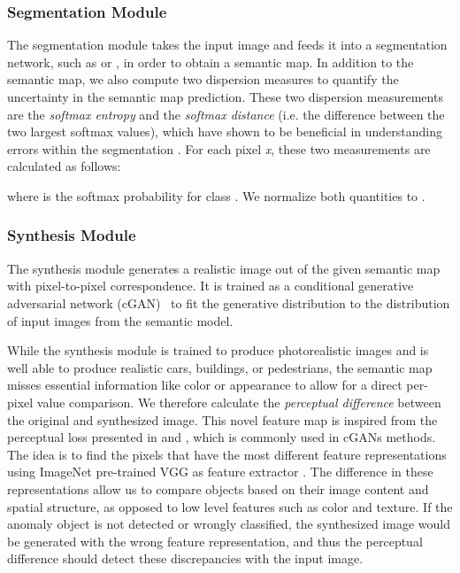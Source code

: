 \documentclass[final]{cvpr}
\begin{document}
\subsubsection{Segmentation Module}
The segmentation module takes the input image and feeds it into a segmentation network, such as \cite{DeepLabV3+Label} or \cite{PSPNet}, in order to obtain a semantic map. In addition to the semantic map, we also compute two dispersion measures to quantify the uncertainty in the semantic map prediction. These two dispersion measurements are the \textit{softmax entropy}  \cite{entropy, bayes_ensemble} and the \textit{softmax distance}  (i.e. the difference between the two largest softmax values), which have shown to be beneficial in understanding errors within the segmentation \cite{meta}. For each pixel \textit{x}, these two measurements are calculated as follows:





where  is the softmax probability  for class . We normalize both quantities to .

\subsubsection{Synthesis Module}
The synthesis module generates a realistic image out of the given semantic map with pixel-to-pixel correspondence. It is trained as a conditional generative adversarial network (cGAN)~\cite{Pix2PixHd, ccfpse} to fit the generative distribution to the distribution of input images from the semantic model.

While the synthesis module is trained to produce photorealistic images and is well able to produce realistic cars, buildings, or pedestrians, the semantic map misses essential information like color or appearance to allow for a direct per-pixel value comparison. We therefore calculate the \textit{perceptual difference}  between the original and synthesized image. This novel feature map is inspired from the perceptual loss presented in \cite{perceptual_diff} and \cite{perceptual_diff_2}, which is commonly used in cGANs methods. 
The idea is to find the pixels that have the most different feature representations using ImageNet \cite{imagenet} pre-trained VGG as feature extractor \cite{vgg}. The difference in these representations allow us to compare objects based on their image content and spatial structure, as opposed to low level features such as color and texture. If the anomaly object is not detected or wrongly classified, the synthesized image would be generated with the wrong feature representation, and thus the perceptual difference should detect these discrepancies with the input image. 
\end{document}
